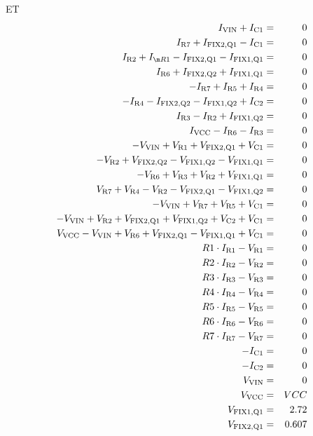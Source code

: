 \begin{example}{ET}
\begin{eqnarray}
I_{\rm VIN}+I_{\rm C1} & = & 0 \label{BJTAmpSTA1}\\
I_{\rm R7}+I_{\rm FIX2,Q1}-I_{\rm C1} & = & 0 \\
I_{\rm R2}+I_{\m R1}-I_{\rm FIX2,Q1}-I_{\rm FIX1,Q1} & = & 0 \\
I_{\rm R6}+I_{\rm FIX2,Q2}+I_{\rm FIX1,Q1} & = & 0 \\
-I_{\rm R7}+I_{\rm R5}+I_{\rm R4} & = & 0 \\
-I_{\rm R4}-I_{\rm FIX2,Q2}-I_{\rm FIX1,Q2}+I_{\rm C2} & = & 0 \\
I_{\rm R3}-I_{\rm R2}+I_{\rm FIX1,Q2} & = & 0 \\
I_{\rm VCC}-I_{\rm R6}-I_{\rm R3} & = & 0 \\
  \medskip
-V_{\rm VIN}+V_{\rm R1}+V_{\rm FIX2,Q1}+V_{\rm C1} & = & 0 \\
-V_{\rm R2}+V_{\rm FIX2,Q2}-V_{\rm FIX1,Q2}-V_{\rm FIX1,Q1} & = & 0 \\
-V_{\rm R6}+V_{\rm R3}+V_{\rm R2}+V_{\rm FIX1,Q1} & = & 0 \\
V_{\rm R7}+V_{\rm R4}-V_{\rm R2}-V_{\rm FIX2,Q1}-V_{\rm FIX1,Q2} & = & 0 \\
-V_{\rm VIN}+V_{\rm R7}+V_{\rm R5}+V_{\rm C1} & = & 0 \\
-V_{\rm VIN}+V_{\rm R2}+V_{\rm FIX2,Q1}+V_{\rm FIX1,Q2}+V_{\rm C2}
  +V_{\rm C1} & = & 0 \\
V_{\rm VCC}-V_{\rm VIN}+V_{\rm R6}+V_{\rm FIX2,Q1}-V_{\rm FIX1,Q1}
  +V_{\rm C1} & = & 0 \label{BJTAmpSTAlastlin} \\
  \medskip
R1 \cdot I_{\rm R1}-V_{\rm R1} & = & 0 \\
R2 \cdot I_{\rm R2}-V_{\rm R2} & = & 0 \\
R3 \cdot I_{\rm R3}-V_{\rm R3} & = & 0 \\
R4 \cdot I_{\rm R4}-V_{\rm R4} & = & 0 \\
R5 \cdot I_{\rm R5}-V_{\rm R5} & = & 0 \\
R6 \cdot I_{\rm R6}-V_{\rm R6} & = & 0 \\
R7 \cdot I_{\rm R7}-V_{\rm R7} & = & 0 \\
-I_{\rm C1} & = & 0 \\
-I_{\rm C2} & = & 0 \\
V_{\rm VIN} & = & 0 \label{BJTAmpSTAvin} \\
V_{\rm VCC} & = & VCC \\
V_{\rm FIX1,Q1} & = & 2.72 \\
V_{\rm FIX2,Q1} & = & 0.607 \\

\end{eqnarray}
\end{example}
